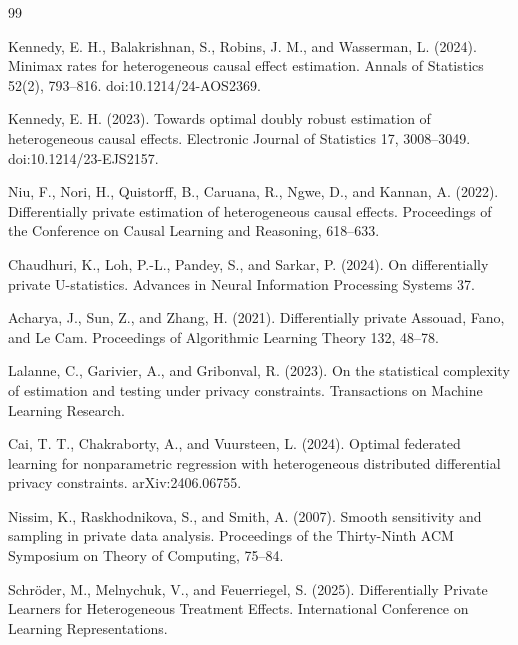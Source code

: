 \documentclass{article}
\begin{document}
\begin{thebibliography}{99}

   Kennedy, E. H., Balakrishnan, S., Robins, J. M., and Wasserman, L. (2024). Minimax rates for heterogeneous causal effect estimation. Annals of Statistics 52(2), 793--816. doi:10.1214/24-AOS2369.

   Kennedy, E. H. (2023). Towards optimal doubly robust estimation of heterogeneous causal effects. Electronic Journal of Statistics 17, 3008--3049. doi:10.1214/23-EJS2157.

   Niu, F., Nori, H., Quistorff, B., Caruana, R., Ngwe, D., and Kannan, A. (2022). Differentially private estimation of heterogeneous causal effects. Proceedings of the Conference on Causal Learning and Reasoning, 618--633.

   Chaudhuri, K., Loh, P.-L., Pandey, S., and Sarkar, P. (2024). On differentially private U-statistics. Advances in Neural Information Processing Systems 37.

   Acharya, J., Sun, Z., and Zhang, H. (2021). Differentially private Assouad, Fano, and Le Cam. Proceedings of Algorithmic Learning Theory 132, 48--78.

   Lalanne, C., Garivier, A., and Gribonval, R. (2023). On the statistical complexity of estimation and testing under privacy constraints. Transactions on Machine Learning Research.

   Cai, T. T., Chakraborty, A., and Vuursteen, L. (2024). Optimal federated learning for nonparametric regression with heterogeneous distributed differential privacy constraints. arXiv:2406.06755.

   Nissim, K., Raskhodnikova, S., and Smith, A. (2007). Smooth sensitivity and sampling in private data analysis. Proceedings of the Thirty-Ninth ACM Symposium on Theory of Computing, 75--84.

   Schröder, M., Melnychuk, V., and Feuerriegel, S. (2025). Differentially Private Learners for Heterogeneous Treatment Effects. International Conference on Learning Representations.

\end{thebibliography}
\end{document}
